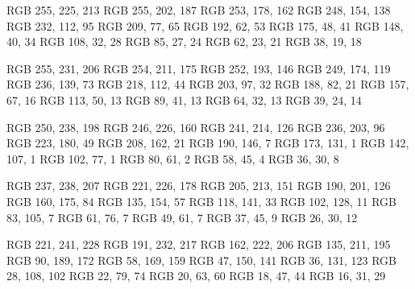 \definecolor{red50}  {RGB} {255, 225, 213}
\definecolor{red100} {RGB} {255, 202, 187}
\definecolor{red150} {RGB} {253, 178, 162}
\definecolor{red200} {RGB} {248, 154, 138}
\definecolor{red300} {RGB} {232, 112, 95}
\definecolor{red400} {RGB} {209, 77, 65}
\definecolor{red500} {RGB} {192, 62, 53}
\definecolor{red600} {RGB} {175, 48, 41}
\definecolor{red700} {RGB} {148, 40, 34}
\definecolor{red800} {RGB} {108, 32, 28}
\definecolor{red850} {RGB} {85, 27, 24}
\definecolor{red900} {RGB} {62, 23, 21}
\definecolor{red950} {RGB} {38, 19, 18}

\definecolor{orange50}  {RGB} {255, 231, 206}
\definecolor{orange100} {RGB} {254, 211, 175}
\definecolor{orange150} {RGB} {252, 193, 146}
\definecolor{orange200} {RGB} {249, 174, 119}
\definecolor{orange300} {RGB} {236, 139, 73}
\definecolor{orange400} {RGB} {218, 112, 44}
\definecolor{orange500} {RGB} {203, 97, 32}
\definecolor{orange600} {RGB} {188, 82, 21}
\definecolor{orange700} {RGB} {157, 67, 16}
\definecolor{orange800} {RGB} {113, 50, 13}
\definecolor{orange850} {RGB} {89, 41, 13}
\definecolor{orange900} {RGB} {64, 32, 13}
\definecolor{orange950} {RGB} {39, 24, 14}

\definecolor{yellow50}  {RGB} {250, 238, 198}
\definecolor{yellow100} {RGB} {246, 226, 160}
\definecolor{yellow150} {RGB} {241, 214, 126}
\definecolor{yellow200} {RGB} {236, 203, 96}
\definecolor{yellow300} {RGB} {223, 180, 49}
\definecolor{yellow400} {RGB} {208, 162, 21}
\definecolor{yellow500} {RGB} {190, 146, 7}
\definecolor{yellow600} {RGB} {173, 131, 1}
\definecolor{yellow700} {RGB} {142, 107, 1}
\definecolor{yellow800} {RGB} {102, 77, 1}
\definecolor{yellow850} {RGB} {80, 61, 2}
\definecolor{yellow900} {RGB} {58, 45, 4}
\definecolor{yellow950} {RGB} {36, 30, 8}

\definecolor{green50}  {RGB} {237, 238, 207}
\definecolor{green100} {RGB} {221, 226, 178}
\definecolor{green150} {RGB} {205, 213, 151}
\definecolor{green200} {RGB} {190, 201, 126}
\definecolor{green300} {RGB} {160, 175, 84}
\definecolor{green400} {RGB} {135, 154, 57}
\definecolor{green500} {RGB} {118, 141, 33}
\definecolor{green600} {RGB} {102, 128, 11}
\definecolor{green700} {RGB} {83, 105, 7}
\definecolor{green800} {RGB} {61, 76, 7}
\definecolor{green850} {RGB} {49, 61, 7}
\definecolor{green900} {RGB} {37, 45, 9}
\definecolor{green950} {RGB} {26, 30, 12}

\definecolor{cyan50}  {RGB} {221, 241, 228}
\definecolor{cyan100} {RGB} {191, 232, 217}
\definecolor{cyan150} {RGB} {162, 222, 206}
\definecolor{cyan200} {RGB} {135, 211, 195}
\definecolor{cyan300} {RGB} {90, 189, 172}
\definecolor{cyan400} {RGB} {58, 169, 159}
\definecolor{cyan500} {RGB} {47, 150, 141}
\definecolor{cyan600} {RGB} {36, 131, 123}
\definecolor{cyan700} {RGB} {28, 108, 102}
\definecolor{cyan800} {RGB} {22, 79, 74}
\definecolor{cyan850} {RGB} {20, 63, 60}
\definecolor{cyan900} {RGB} {18, 47, 44}
\definecolor{cyan950} {RGB} {16, 31, 29}

